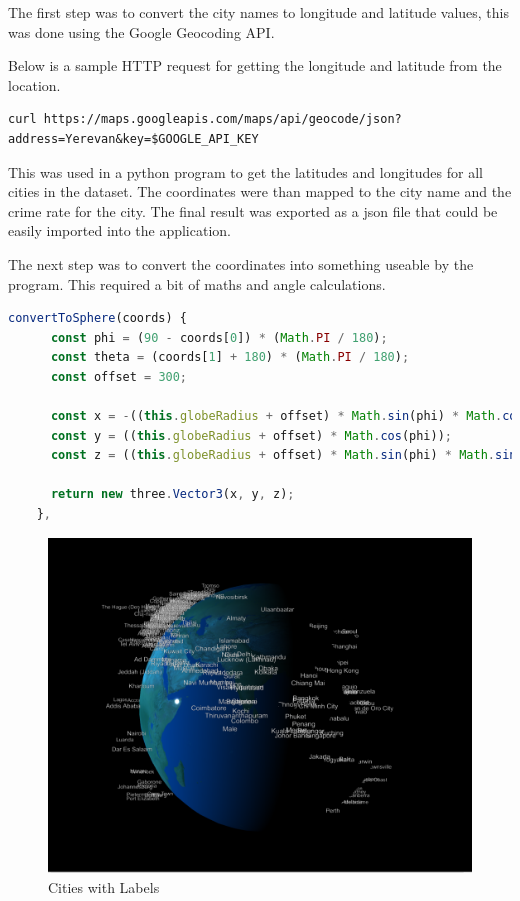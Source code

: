 \documentclass[]{article}
\begin{document}
The first step was to convert the city names to longitude and latitude values,
this was done using the Google Geocoding API.

Below is a sample HTTP request for getting the longitude and latitude from the location.

\begin{verbatim}
curl https://maps.googleapis.com/maps/api/geocode/json?address=Yerevan&key=$GOOGLE_API_KEY
\end{verbatim}

This was used in a python program to get the latitudes and longitudes for all cities in the dataset.
The coordinates were than mapped to the city name and the crime rate for the city.
The final result was exported as a json file that could be easily imported into the application.

The next step was to convert the coordinates into something useable by the program.
This required a bit of maths and angle calculations.

\begin{lstlisting}[language=JavaScript]
    convertToSphere(coords) {
      const phi = (90 - coords[0]) * (Math.PI / 180);
      const theta = (coords[1] + 180) * (Math.PI / 180);
      const offset = 300;

      const x = -((this.globeRadius + offset) * Math.sin(phi) * Math.cos(theta));
      const y = ((this.globeRadius + offset) * Math.cos(phi));
      const z = ((this.globeRadius + offset) * Math.sin(phi) * Math.sin(theta));

      return new three.Vector3(x, y, z);
    },
\end{lstlisting}

\begin{figure}[H]
   \centering
   \includegraphics[width=0.8\linewidth]{images/city_labels}
   \caption{Cities with Labels}
   \label{fig:city_labels}
\end{figure}
\end{document}
